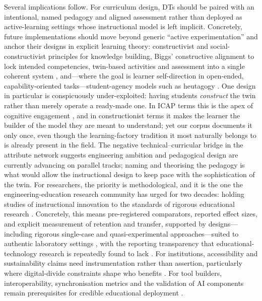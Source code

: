 Several implications follow. For curriculum design, DTs should be paired with an
intentional, named pedagogy and aligned assessment rather than deployed as
active-learning settings whose instructional model is left implicit. Concretely,
future implementations should move beyond generic ``active experimentation'' and
anchor their designs in explicit learning theory: constructivist and
social-constructivist principles for knowledge building, Biggs' constructive
alignment to lock intended competencies, twin-based activities and assessment into
a single coherent system \citep{biggs_enhancing_1996}, and---where the goal is learner
self-direction in open-ended, capability-oriented tasks---student-agency models such
as heutagogy \citep{blaschke_heutagogy_2012}. One design in particular is conspicuously
under-exploited: having students \emph{construct} the twin rather than merely operate a
ready-made one. In ICAP terms this is the apex of cognitive engagement
\citep{chi_icap_2014}, and in constructionist terms it makes the learner the builder of
the model they are meant to understand; yet our corpus documents it only once,
even though the learning-factory tradition it most naturally belongs to is already
present in the field. The negative technical--curricular bridge
in the attribute network suggests engineering ambition and pedagogical design are
currently advancing on parallel tracks; naming and theorising the pedagogy is what
would allow the instructional design to keep pace with the sophistication of the
twin. For
researchers, the priority is methodological, and it is the one the
engineering-education research community has urged for two decades: holding studies
of instructional innovation to the standards of rigorous educational research
\citep{streveler_conducting_2006}. Concretely, this means
pre-registered comparators, reported effect sizes, and explicit measurement of
retention and transfer, supported by designs---including rigorous single-case and
quasi-experimental approaches---suited to authentic laboratory settings
\citep{dayo_evaluating_2024}, with the reporting transparency that educational-technology
research is repeatedly found to lack \citep{demir_analyzing_2025}. For institutions,
accessibility and sustainability claims need instrumentation rather than
assertion, particularly where digital-divide constraints shape who benefits
\citep{eltaiba_benefits_2025}. For tool builders,
interoperability, synchronisation metrics and the validation of AI components
remain prerequisites for credible educational deployment \citep{chen_ai-enhanced_2025}.

